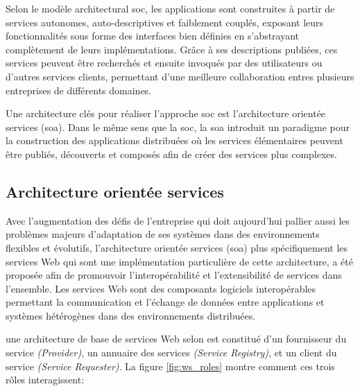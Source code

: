   Selon le modèle architectural \acrshort{soc}, les applications sont
  construites à partir de services autonomes, auto-descriptives et
  faiblement couplés, exposant leurs fonctionnalités sous forme des
  interfaces bien définies en s'abstrayant complètement de leurs
  implémentations. Grâce à ses descriptions publiées, ces services
  peuvent être recherchés et ensuite invoqués par des utilisateurs ou
  d'autres services clients, permettant d'une meilleure collaboration
  entres plusieurs entreprises de différents domaines.\medskip

  Une architecture clés pour réaliser l'approche \acrshort{soc} est
  l'architecture orientée services (\acrshort{soa}).  Dans le même
  sens que la \acrshort{soc}, la \acrshort{soa} introduit un paradigme
  pour la construction des applications distribuées où les services
  élémentaires peuvent être publiés, découverts et composés afin de
  créer des services plus complexes.

  \subsection{Architecture orientée services}
  \label{sec:soa}
  Avec l'augmentation des défis de l'entreprise qui doit aujourd'hui
  pallier aussi les problèmes majeurs d'adaptation de ses systèmes
  dans des environnements flexibles et évolutifs, l'architecture
  orientée services (\acrshort{soa}) plus spécifiquement les services
  Web qui sont une implémentation particulière de cette architecture,
  a été proposée afin de promouvoir l'interopérabilité et
  l'extensibilité de services dans l'ensemble. Les services Web sont
  des composants logiciels interopérables permettant la communication
  et l'échange de données entre applications et systèmes hétérogènes
  dans des environnements distribuées.

  

  une architecture de base de services Web selon
  \cite{gottschalk2002introduction} est constitué d'un fournisseur du
  service \textit{(Provider)}, un annuaire des services
  \textit{(Service Registry)}, et un client du service
  \textit{(Service Requester)}. La figure \ref{fig:ws_roles} montre
  comment ces trois rôles interagissent:


